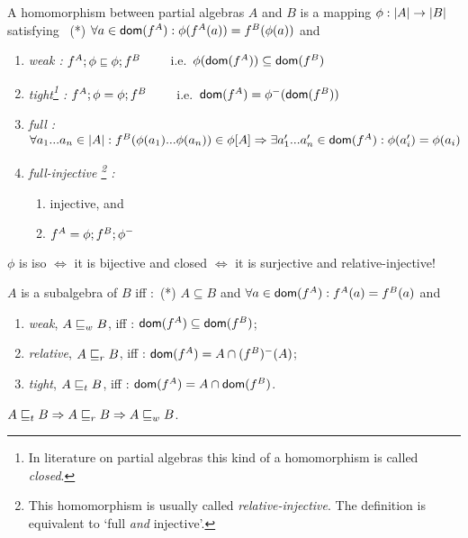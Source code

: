 \documentclass[10pt]{article}
\begin{document}
\begin{Definition}\label{de:PAs}
A homomorphism between partial algebras $A$ and $B$ is a mapping 
$\phi:|A|\rightarrow|B|$ satisfying \ (*) $\forall a\in \mbox{\sf dom}(f^A):
\phi(f^A(a))= f^B(\phi(a))$ and

\begin{enumerate} \MyLPar
\item\label{it:paw}
{\em weak :} $f^A;\phi\mathrel{{\scriptstyle{\sqsubseteq}}}\phi;f^B$ \ \ \ \
i.e.\ $\phi(\mbox{\sf dom}(f^A)) \subseteq \mbox{\sf dom}(f^B)$
\item\label{it:pat}
{\em tight\footnote{In literature on partial algebras this kind of a
homomorphism is called {\em closed}.} :}  
$f^A;\phi=\phi;f^B$ \ \ \ \ 
i.e.\  $\mbox{\sf dom}(f^A)= \phi^{-}(\mbox{\sf dom}(f^B))$
\item 
{\em full :} $\forall a_1...a_n\in|A|: f^B(\phi(a_1)...\phi(a_n))\in \phi[A]
\Rightarrow \exists a'_1...a'_n\in \mbox{\sf dom}(f^A):\phi(a'_i)=\phi(a_i)$
\item 
{\em full-injective \footnote{This
homomorphism is usually called {\em  relative-injective}. The
definition is equivalent to `full {\em and} injective'.} :}
\begin{enumerate}\MyLPar
 \item injective, and
 \item $f^A= \phi;f^B;\phi^{-}$
 \end{enumerate} 
\end{enumerate} 
\end{Definition}
%
\begin{Fact}
$\phi$ is iso $\iff$ it is bijective and closed
$\iff$ it is surjective and relative-injective!
\end{Fact}
%
\begin{Definition}
$A$ is a subalgebra of $B$ iff :\ 
  (*) $A\subseteq B$ and $\forall a\in \mbox{\sf dom}(f^A): f^A(a)= f^B(a)$ and
\begin{enumerate}\MyLPar
\item\label{weak} {\em weak}, $A\mathrel{\sqsubseteq}_w B$, iff : 
   $\mbox{\sf dom}(f^A) \subseteq \mbox{\sf dom}(f^B)$;
\item\label{rel} {\em relative}, $A\mathrel{\sqsubseteq}_r B$, iff : 
   $\mbox{\sf dom}(f^A) = A \cap (f^B)^{-}(A)$;
\item\label{tight} {\em tight}, $A\mathrel{\sqsubseteq}_t B$, iff : 
   $\mbox{\sf dom}(f^A) = A \cap \mbox{\sf dom}(f^B)$.
\end{enumerate}
\end{Definition}
%
\begin{Fact}
$A\mathrel{\sqsubseteq}_t B \Rightarrow A\mathrel{\sqsubseteq}_r B \Rightarrow A\mathrel{\sqsubseteq}_w B$.
\end{Fact}
\end{document}
